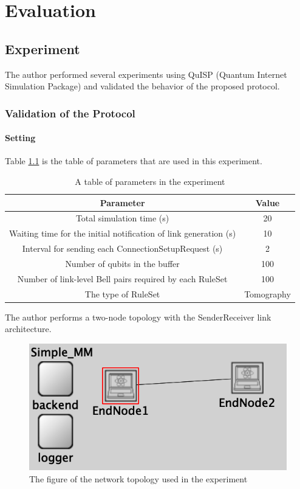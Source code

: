 \chapter{Evaluation}
\label{evaluation}

\section{Experiment}

The author performed several experiments using QuISP (Quantum Internet Simulation Package) and validated the behavior of the proposed protocol.

\subsection{Validation of the Protocol}

\subsubsection{Setting}
Table \ref{table:parameter-for-experiment1} is the table of parameters that are used in this experiment.

\begin{table}[ht]
  \begin{center}
    \begin{tabular}{|c|c|} 
      \hline
      Parameter & Value \\ \hline \cline{1-2}
      Total simulation time (s) &  20 \\ \cline{1-2}
      Waiting time for the initial notification of link generation (s) &  10 \\ \cline{1-2} 
      Interval for sending each ConnectionSetupRequest (s) &  2 \\ \cline{1-2} 
      Number of qubits in the buffer & 100  \\  \cline{1-2}
      Number of link-level Bell pairs required by each RuleSet &  100 \\ \cline{1-2}
      The type of RuleSet & Tomography \\  \hline  \cline{1-2}
    \end{tabular}
    \caption{A table of parameters in the experiment}
    \label{table:parameter-for-experiment1}
  \end{center}
\end{table}

The author performs a two-node topology with the SenderReceiver link architecture.
\begin{figure}[H]
  \centerline{\includegraphics[width=.6\columnwidth]{images/topology_MM.png}}
  \caption{The figure of the network topology used in the experiment}
\end{figure}

